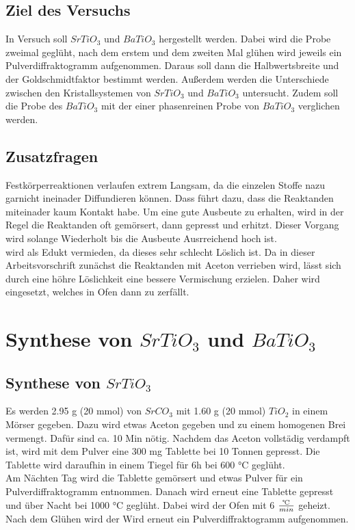 \documentclass[12pt, a4paper]{article}
\begin{document}
\subsection{Ziel des Versuchs}
{
In Versuch soll $SrTiO_3$ und $BaTiO_3$ hergestellt werden. Dabei wird die Probe zweimal geglüht, nach dem erstem
und dem zweiten Mal glühen wird jeweils ein Pulverdiffraktogramm aufgenommen. Daraus soll dann die Halbwertsbreite und 
der Goldschmidtfaktor bestimmt werden. Außerdem werden die Unterschiede zwischen den Kristallsystemen von $SrTiO_3$ und $BaTiO_3$ 
untersucht. Zudem soll die Probe des $BaTiO_3$ mit der einer phasenreinen Probe von $BaTiO_3$ verglichen werden.\cite{Skript}
}

\subsection{Zusatzfragen}
Festkörperreaktionen verlaufen extrem Langsam, da die einzelen Stoffe nazu garnicht ineinader Diffundieren können. Dass führt 
dazu, dass die Reaktanden miteinader kaum Kontakt habe. Um eine gute Ausbeute zu erhalten, wird in der Regel die Reaktanden oft gemörsert, dann gepresst und 
erhitzt. Dieser Vorgang wird solange Wiederholt bis die Ausbeute Ausrreichend hoch ist.\\
 wird als Edukt vermieden, da dieses sehr schlecht Löslich ist. Da in dieser Arbeitsvorschrift zunächst die Reaktanden mit Aceton verrieben wird, lässt sich durch eine 
höhre Löslichkeit eine bessere Vermischung erzielen. Daher wird  eingesetzt, welches in Ofen dann zu  zerfällt. 



\newpage
\section{\texorpdfstring{Synthese von $SrTiO_3$ und $BaTiO_3$}{Synthese von SrTiO3 und BaTiO3}}
\subsection{\texorpdfstring{Synthese von $SrTiO_3$}{Synthese von SrTiO3}}
{Es werden 2.95 g (20 mmol) von $SrCO_3$ mit 1.60 g (20 mmol) $TiO_2$ in einem Mörser gegeben. 
Dazu wird etwas Aceton gegeben und 
zu einem homogenen Brei vermengt. Dafür sind ca. 10 Min nötig. Nachdem das Aceton vollstädig verdampft ist, wird mit dem Pulver eine 300 mg 
Tablette bei 10 Tonnen gepresst. Die Tablette wird daraufhin in einem Tiegel für 6h bei 600 °C geglüht.\\
Am Nächten Tag wird die Tablette gemörsert und etwas Pulver für ein Pulverdiffraktogramm entnommen. Danach wird erneut eine Tablette gepresst und über Nacht
bei 1000 °C geglüht. Dabei wird der Ofen mit 6 $\frac{\tccentigrade}{min}$ geheizt. Nach dem Glühen wird der Wird erneut ein Pulverdiffraktogramm aufgenommen.
}
\end{document}
